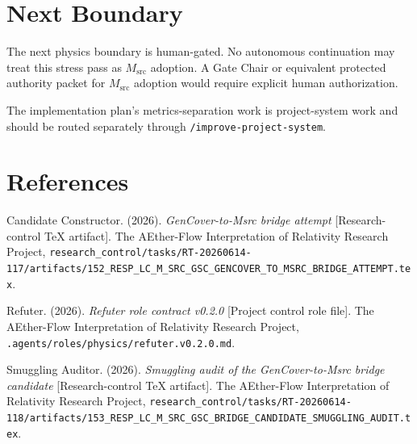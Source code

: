 \documentclass[11pt]{article}
\newcommand{\Msrc}{M_{\mathrm{src}}}
\begin{document}
\section{Next Boundary}

The next physics boundary is human-gated. No autonomous continuation may treat
this stress pass as \(\Msrc\) adoption. A Gate Chair or equivalent protected
authority packet for \(\Msrc\) adoption would require explicit human
authorization.

The implementation plan's metrics-separation work is project-system work and
should be routed separately through \texttt{/improve-project-system}.

\section*{References}

Candidate Constructor. (2026). \textit{GenCover-to-Msrc bridge attempt}
[Research-control TeX artifact]. The AEther-Flow Interpretation of Relativity
Research Project,
\texttt{research\_control/tasks/RT-20260614-117/artifacts/152\_RESP\_LC\_M\_SRC\_GSC\_GENCOVER\_TO\_MSRC\_BRIDGE\_ATTEMPT.tex}.

Refuter. (2026). \textit{Refuter role contract v0.2.0} [Project control role
file]. The AEther-Flow Interpretation of Relativity Research Project,
\texttt{.agents/roles/physics/refuter.v0.2.0.md}.

Smuggling Auditor. (2026). \textit{Smuggling audit of the GenCover-to-Msrc
bridge candidate} [Research-control TeX artifact]. The AEther-Flow
Interpretation of Relativity Research Project,
\texttt{research\_control/tasks/RT-20260614-118/artifacts/153\_RESP\_LC\_M\_SRC\_GSC\_BRIDGE\_CANDIDATE\_SMUGGLING\_AUDIT.tex}.
\end{document}
